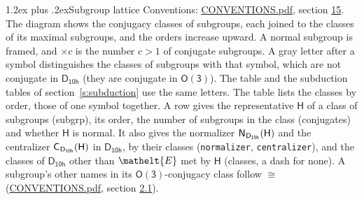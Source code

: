 \documentclass[10pt,a4paper]{article}
\makeatletter
\renewcommand\section{\@startsection{section}{1}{\z@}{-3ex plus -1ex minus -.2ex}%
  {1.2ex plus .2ex}{\normalfont\large\sffamily\bfseries\color{parttitle}}}
\numberwithin{equation}{section}
\newcommand{\eltfont}[1]{{\let\sigma\eltsigma\mathelt{#1}}}
\newcommand{\grp}[1]{\mathsf{#1}}
\newcommand{\cls}[1]{\eltfont{#1}}
\newcommand{\samecls}{\cong}
\newcommand{\hairsp}{\mkern1mu}
\makeatother
\begin{document}
\section{Subgroup lattice}\label{s:subgroups}
Conventions: \href{../../CONVENTIONS.pdf}{CONVENTIONS.pdf}, section \href{../../CONVENTIONS.pdf\#conv.15}{15}.
The diagram shows the conjugacy classes of subgroups, each joined to the classes of its maximal subgroups, and the orders increase upward. A normal subgroup is framed, and ${\times}c$ is the number $c > 1$ of conjugate subgroups. A gray letter after a symbol distinguishes the classes of subgroups with that symbol, which are not conjugate in $\grp{D_{10h}}$ (they are conjugate in \href{O3.pdf}{$\grp{O(3)}$}). The table and the subduction tables of section~\ref{s:subduction} use the same letters. The table lists the classes by order, those of one symbol together. \label{n:group.H}\label{n:head.subgroup}\label{n:head.order}\label{n:head.conjugates}\label{n:head.normal}A row gives the representative $\grp{H}$ of a class of subgroups (subgrp), its order, the number of subgroups in the class (conjugates) and whether $\grp{H}$ is normal. \label{n:group.normalizer}\label{n:group.centralizer}\label{n:head.classes}It also gives the normalizer $\grp{N}_{\hairsp \grp{D_{10h}}}(\grp{H})$ and the centralizer $\grp{C}_{\hairsp \grp{D_{10h}}}(\grp{H})$ in $\grp{D_{10h}}$, by their classes (\texttt{normalizer}, \texttt{centralizer}), and the classes of $\grp{D_{10h}}$ other than $\cls{E}$ met by $\grp{H}$ (classes, a dash for none). A subgroup's other names in its \href{O3.pdf}{$\grp{O(3)}$}-conjugacy class follow $\samecls$ (\href{../../CONVENTIONS.pdf}{CONVENTIONS.pdf}, section \href{../../CONVENTIONS.pdf\#conv.2.1}{2.1}).
\end{document}
